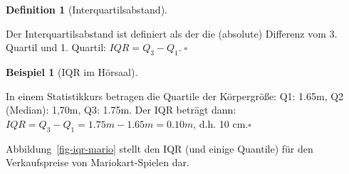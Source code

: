 \documentclass[
  a4paper,
]{scrbook}
\theoremstyle{definition}
\newtheorem{example}{Beispiel}[chapter]
\theoremstyle{definition}
\newtheorem{definition}{Definition}[chapter]
\theoremstyle{definition}
\theoremstyle{remark}
\begin{document}
\begin{definition}[Interquartilsabstand]\protect\hypertarget{def-iqr}{}\label{def-iqr}

Der Interquartilsabstand ist definiert als der die (absolute) Differenz
vom 3. Quartil und 1. Quartil: \(IQR = Q_3-Q_1. \; \square\)

\end{definition}

\begin{example}[IQR im
Hörsaal]\protect\hypertarget{exm-iqr}{}\label{exm-iqr}

In einem Statistikkurs betragen die Quartile der Körpergröße: Q1: 1.65m,
Q2 (Median): 1,70m, Q3: 1.75m. Der IQR beträgt dann:
\(IQR = Q_3-Q_1 = 1.75m - 1.65m = 0.10m\), d.h. 10 cm.\(\square\)

\end{example}

Abbildung~\ref{fig-iqr-mario} stellt den IQR (und einige Quantile) für
den Verkaufspreise von Mariokart-Spielen dar.
\end{document}
